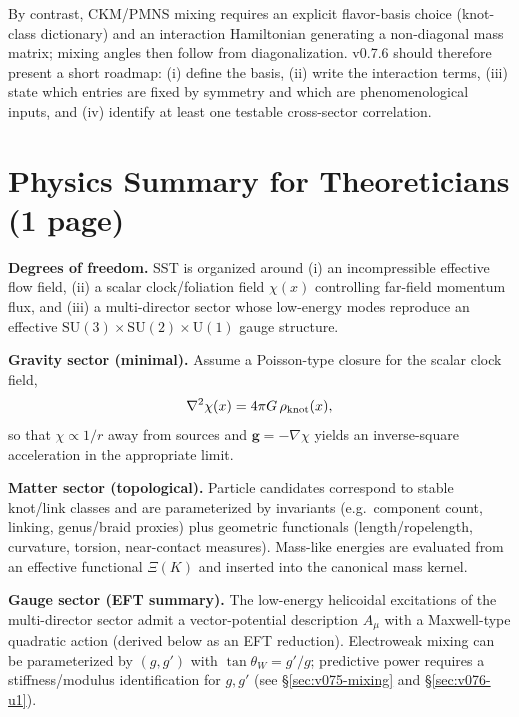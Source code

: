 \documentclass[10pt]{article}
\begin{document}
By contrast, CKM/PMNS mixing requires an explicit flavor-basis choice (knot-class
dictionary) and an interaction Hamiltonian generating a non-diagonal mass matrix;
mixing angles then follow from diagonalization. v0.7.6 should therefore present a
short roadmap: (i) define the basis, (ii) write the interaction terms, (iii) state
which entries are fixed by symmetry and which are phenomenological inputs, and (iv)
identify at least one testable cross-sector correlation.


\section{Physics Summary for Theoreticians (1 page)}
\label{sec:v076-theory-summary}

\noindent\textbf{Degrees of freedom.}
SST is organized around (i) an incompressible effective flow field,
(ii) a scalar clock/foliation field $\chi(x)$ controlling far-field momentum flux,
and (iii) a multi-director sector whose low-energy modes reproduce an effective
$\mathrm{SU}(3)\times\mathrm{SU}(2)\times\mathrm{U}(1)$ gauge structure.

\medskip
\noindent\textbf{Gravity sector (minimal).}
Assume a Poisson-type closure for the scalar clock field,
\begin{equation}
\nabla^2 \chi(x) = 4\pi G\,\rho_{\rm knot}(x),
\end{equation}
so that $\chi \propto 1/r$ away from sources and $\mathbf{g}=-\nabla\chi$ yields an inverse-square
acceleration in the appropriate limit.

\medskip
\noindent\textbf{Matter sector (topological).}
Particle candidates correspond to stable knot/link classes and are parameterized by
invariants (e.g.\ component count, linking, genus/braid proxies) plus geometric
functionals (length/ropelength, curvature, torsion, near-contact measures).
Mass-like energies are evaluated from an effective functional $\Xi(K)$
and inserted into the canonical mass kernel.

\medskip
\noindent\textbf{Gauge sector (EFT summary).}
The low-energy helicoidal excitations of the multi-director sector admit a vector-potential
description $A_\mu$ with a Maxwell-type quadratic action (derived below as an EFT reduction).
Electroweak mixing can be parameterized by $(g,g')$ with $\tan\theta_W=g'/g$; predictive power
requires a stiffness/modulus identification for $g,g'$ (see \S\ref{sec:v075-mixing} and \S\ref{sec:v076-u1}).
\end{document}
